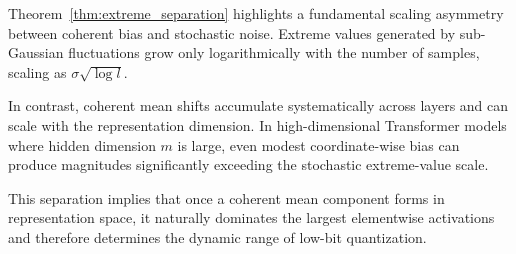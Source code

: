 Theorem~\ref{thm:extreme_separation} highlights a fundamental scaling asymmetry between coherent bias and stochastic noise. Extreme values generated by sub-Gaussian fluctuations grow only logarithmically with the number of samples, scaling as $\sigma\sqrt{\log l}$. 

In contrast, coherent mean shifts accumulate systematically across layers and can scale with the representation dimension. In high-dimensional Transformer models where hidden dimension $m$ is large, even modest coordinate-wise bias can produce magnitudes significantly exceeding the stochastic extreme-value scale.

This separation implies that once a coherent mean component forms in representation space, it naturally dominates the largest elementwise activations and therefore determines the dynamic range of low-bit quantization.